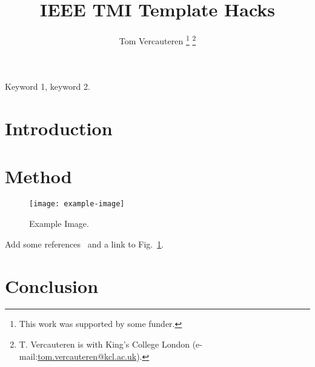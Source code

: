 \documentclass[journal,twoside,web]{ieeecolor}
\newcommand{\figref}[1]{Fig.~\ref{#1}}
\begin{document}

\title{IEEE TMI Template Hacks}
\author{Tom Vercauteren
\thanks{This work was supported by some funder.}%
\thanks{T. Vercauteren is with King's College London (e-mail:\href{mailto:tom.vercauteren@kcl.ac.uk}{tom.vercauteren@kcl.ac.uk}). }%
}


\maketitle

\begin{abstract}
\blindtext
\end{abstract}

\begin{IEEEkeywords}
Keyword 1, keyword 2.
\end{IEEEkeywords}

\section{Introduction}
\blindtext[2]

\section{Method}
\blindmathpaper

\begin{figure}[tbh!]
\centering
\texttt{[image: example-image]}
\caption{Example Image.\label{fig:example}}
\end{figure}

\blindtext
Add some references~\cite{article-full,inproceedings-full,phdthesis-full,Fidon:PAMI:2024,Bakas:arXiv:2018,Alabi:MedIA:2025} and a link to \figref{fig:example}.

\section{Conclusion}
\blindtext[3]



 
\end{document}
